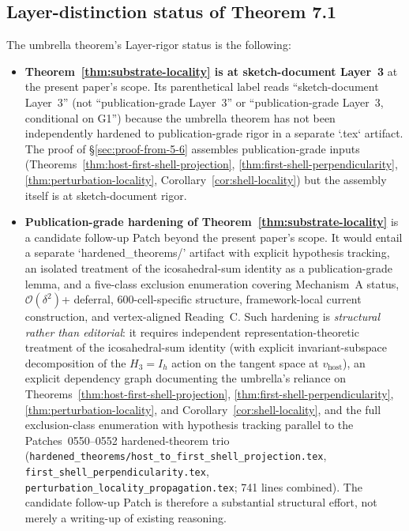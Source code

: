 \documentclass[11pt,letterpaper]{article}
\newcommand{\vhost}{v_{\text{host}}}
\newcommand{\bigO}[1]{\mathcal{O}(#1)}
\begin{document}
\subsection{Layer-distinction status of Theorem 7.1}
\label{sec:layer-distinction-status}

The umbrella theorem's Layer-rigor status is the following:

\begin{itemize}[leftmargin=2em]
\item \textbf{Theorem~\ref{thm:substrate-locality} is at sketch-document Layer~3} at the present paper's scope. Its parenthetical label reads ``sketch-document Layer~3'' (not ``publication-grade Layer~3'' or ``publication-grade Layer~3, conditional on G1'') because the umbrella theorem has not been independently hardened to publication-grade rigor in a separate `.tex` artifact. The proof of \S\ref{sec:proof-from-5-6} assembles publication-grade inputs (Theorems~\ref{thm:host-first-shell-projection}, \ref{thm:first-shell-perpendicularity}, \ref{thm:perturbation-locality}, Corollary~\ref{cor:shell-locality}) but the assembly itself is at sketch-document rigor.
\item \textbf{Publication-grade hardening of Theorem~\ref{thm:substrate-locality}} is a candidate follow-up Patch beyond the present paper's scope. It would entail a separate `hardened\_theorems/' artifact with explicit hypothesis tracking, an isolated treatment of the icosahedral-sum identity as a publication-grade lemma, and a five-class exclusion enumeration covering Mechanism~A status, $\bigO{\delta^2}$+ deferral, 600-cell-specific structure, framework-local current construction, and vertex-aligned Reading~C. Such hardening is \emph{structural rather than editorial}: it requires independent representation-theoretic treatment of the icosahedral-sum identity (with explicit invariant-subspace decomposition of the $H_3 = I_h$ action on the tangent space at $\vhost$), an explicit dependency graph documenting the umbrella's reliance on Theorems~\ref{thm:host-first-shell-projection}, \ref{thm:first-shell-perpendicularity}, \ref{thm:perturbation-locality}, and Corollary~\ref{cor:shell-locality}, and the full exclusion-class enumeration with hypothesis tracking parallel to the Patches~0550--0552 hardened-theorem trio (\texttt{hardened\_theorems/host\_to\_first\_shell\_projection.tex}, \texttt{first\_shell\_perpendicularity.tex}, \texttt{perturbation\_locality\_propagation.tex}; 741 lines combined). The candidate follow-up Patch is therefore a substantial structural effort, not merely a writing-up of existing reasoning.

\end{itemize}
\end{document}
